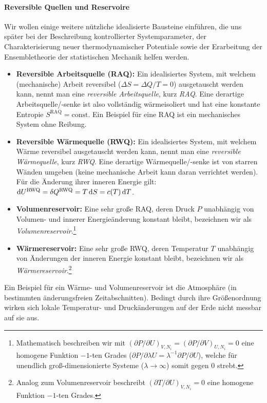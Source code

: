 \paragraph*{Reversible Quellen und Reservoire}
Wir wollen einige weitere nützliche idealisierte Bausteine einführen, die uns später bei der Beschreibung kontrollierter Systemparameter, der Charakterisierung neuer thermodynamischer Potentiale sowie der Erarbeitung der Ensembletheorie der statistischen Mechanik helfen werden.
\begin{itemize}
    \item \textbf{Reversible Arbeitsquelle (RAQ):} Ein idealisiertes System, mit welchem (mechanische) Arbeit reversibel ($\Delta S=\Delta Q/T=0$) ausgetauscht werden kann, nennt man eine \emph{reversible Arbeitsquelle}, kurz \emph{RAQ}. Eine derartige Arbeitsquelle/-senke ist also vollständig wärmeisoliert und hat eine konstante Entropie $S^{\mathrm{RAQ}}=\mathrm{const}$. Ein Beispiel für eine RAQ ist ein mechanisches System ohne Reibung.
    \item \textbf{Reversible Wärmequelle (RWQ):} Ein idealisiertes System, mit welchem Wärme reversibel ausgetauscht werden kann, nennt man eine \emph{reversible Wärmequelle}, kurz \emph{RWQ}. Eine derartige Wärmequelle/-senke ist von starren Wänden umgeben (keine mechanische Arbeit kann daran verrichtet werden). Für die Änderung ihrer inneren Energie gilt: $\mathop{}\!\mathrm{d} U^{\mathrm{RWQ}}=\mathop{}\!\delta Q^{\mathrm{RWQ}}=T\mathop{}\!\mathrm{d} S=c(T)\mathop{}\!\mathrm{d} T$.
    \item \textbf{Volumenreservoir:} Eine sehr große RAQ, deren Druck $P$ unabhängig von Volumen- und innerer Energieänderung konstant bleibt, bezeichnen wir als \emph{Volumenreservoir}.\footnote{Mathematisch beschreiben wir mit $(\partial P/\partial U)_{V,N_i}=(\partial P/\partial V)_{U,N_i}=0$ eine homogene Funktion $-1$-ten Grades ($\partial P/\partial \lambda U=\lambda ^{-1}\partial P/\partial U$), welche für unendlich groß-dimensionierte Systeme ($\lambda\rightarrow \infty$) somit gegen 0 strebt.}
    \item \textbf{Wärmereservoir:} Eine sehr große RWQ, deren Temperatur $T$ unabhängig von Änderungen der inneren Energie konstant bleibt, bezeichnen wir als \emph{Wärmereservoir}.\footnote{Analog zum Volumenreservoir beschreibt $(\partial T/\partial U)_{V,N_i}=0$ eine homogene Funktion $-1$-ten Grades.}
\end{itemize}
Ein Beispiel für ein Wärme- und Volumenreservoir ist die Atmosphäre (in bestimmten änderungsfreien Zeitabschnitten). Bedingt durch ihre Größenordnung wirken sich lokale Temperatur- und Druckänderungen auf der Erde nicht messbar auf sie aus.
